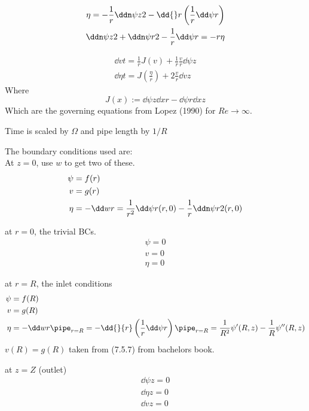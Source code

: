 \documentclass{X:/Documents/Coding/Latex/myreport}
\begin{document}
\begin{align*}
    \eta = -\frac1r \ddn \psi z2 - \dd{}r \left(\frac1r \dd\psi r\right)\\
    \ddn \psi z2 + \ddn \psi r2 - \frac1r \dd \psi r = -r \eta
\end{align*}

\begin{align*}
    \dd vt = \frac1r J(v) + \frac1r \frac vr \dd\psi z\\
    \dd \eta t = J(\frac{\eta}{r}) + 2 \frac vr \dd vz
\end{align*}
Where 
\[J(x) := \dd \psi z \dd xr - \dd \psi r \dd xz \]
Which are the governing equations from Lopez (1990) for $Re \to \infty$.

Time is scaled by $\Omega$ and pipe length by $1/R$


The boundary conditions used are:\\

At $z=0$, use $w$ to get two of these.
\begin{align*}
    \psi &= f(r)\\     
    v &= g(r)\\
    \eta &= - \dd wr = \frac{1}{r^2} \dd \psi r (r,0) - \frac1r \ddn \psi r2 (r,0)
\end{align*} 

at $r=0$, the trivial BCs.
\begin{align*}
    \psi= 0\\
    v = 0\\
    \eta = 0
\end{align*}

at $r= R$, the inlet conditions
\begin{align*}
    \psi &= f(R)\\
    v &= g(R)\\
    \eta &= - \dd wr\pipe_{r=R}  = -\dd{}{r}\left(\frac{1}{r} \dd \psi r\right)\pipe_{r=R}= \frac{1}{R^2} \psi'(R,z) - \frac1R \psi''(R,z)
\end{align*}
$v(R) = g(R)$ taken from (7.5.7) from bachelors book.


at $z=Z$ (outlet)
\begin{align*}
    \dd\psi z = 0\\
    \dd \eta z = 0\\
    \dd vz = 0 
\end{align*}
\end{document}
